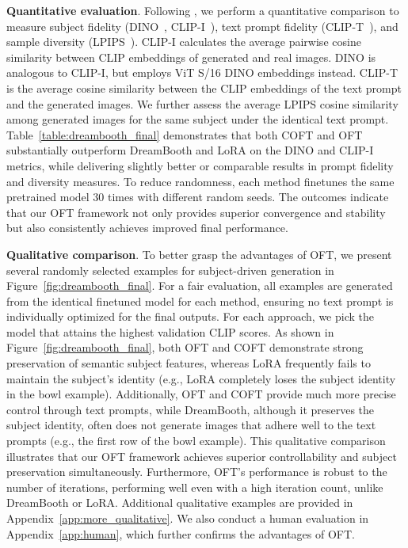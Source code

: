 \textbf{Quantitative evaluation}. Following \cite{ruiz2023dreambooth}, we perform a quantitative comparison to measure subject fidelity (DINO~\cite{caron2021emerging}, CLIP-I~\cite{radford2021learning}), text prompt fidelity (CLIP-T~\cite{radford2021learning}), and sample diversity (LPIPS~\cite{zhang2018unreasonable}). CLIP-I calculates the average pairwise cosine similarity between CLIP embeddings of generated and real images. DINO is analogous to CLIP-I, but employs ViT S/16 DINO embeddings instead. CLIP-T is the average cosine similarity between the CLIP embeddings of the text prompt and the generated images. We further assess the average LPIPS cosine similarity among generated images for the same subject under the identical text prompt. Table~\ref{table:dreambooth_final} demonstrates that both COFT and OFT substantially outperform DreamBooth and LoRA on the DINO and CLIP-I metrics, while delivering slightly better or comparable results in prompt fidelity and diversity measures. To reduce randomness, each method finetunes the same pretrained model 30 times with different random seeds. The outcomes indicate that our OFT framework not only provides superior convergence and stability but also consistently achieves improved final performance.

\textbf{Qualitative comparison}. To better grasp the advantages of OFT, we present several randomly selected examples for subject-driven generation in Figure~\ref{fig:dreambooth_final}. For a fair evaluation, all examples are generated from the identical finetuned model for each method, ensuring no text prompt is individually optimized for the final outputs. For each approach, we pick the model that attains the highest validation CLIP scores. As shown in Figure~\ref{fig:dreambooth_final}, both OFT and COFT demonstrate strong preservation of semantic subject features, whereas LoRA frequently fails to maintain the subject’s identity (e.g., LoRA completely loses the subject identity in the bowl example). Additionally, OFT and COFT provide much more precise control through text prompts, while DreamBooth, although it preserves the subject identity, often does not generate images that adhere well to the text prompts (e.g., the first row of the bowl example). This qualitative comparison illustrates that our OFT framework achieves superior controllability and subject preservation simultaneously. Furthermore, OFT’s performance is robust to the number of iterations, performing well even with a high iteration count, unlike DreamBooth or LoRA. Additional qualitative examples are provided in Appendix~\ref{app:more_qualitative}. We also conduct a human evaluation in Appendix~\ref{app:human}, which further confirms the advantages of OFT.

